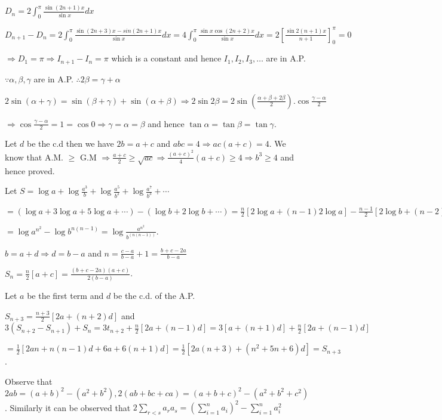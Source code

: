   $\displaystyle D_n = 2\int_0^{\pi}\frac{\sin(2n + 1)x}{\sin x}dx$

  $\displaystyle D_{n + 1} - D_n = 2\int_{0}^\pi\frac{\sin(2n + 3)x - sin(2n + 1)x}{\sin x}dx =
  4\int_0^\pi\frac{\sin x\cos(2n + 2)x}{\sin x}dx = 2\left[\frac{\sin2(n + 1)x}{n + 1}\right]_0^\pi = 0$

  $\Rightarrow D_1 = \pi \Rightarrow I_{n + 1} - I_n = \pi$ which is a constant and hence $I_1, I_2, I_3,
  \ldots$ are in A.P.
\item $\because \alpha, \beta, \gamma$ are in A.P. $\therefore 2\beta = \gamma + \alpha$

  $2\sin(\alpha + \gamma) = \sin(\beta + \gamma) + \sin(\alpha + \beta) \Rightarrow 2\sin2\beta =
  2\sin\left(\frac{\alpha + \beta + 2\beta}{2}\right).\cos\frac{\gamma - \alpha}{2}$

  $\Rightarrow \cos\frac{\gamma - \alpha}{2} = 1 = \cos 0 \Rightarrow \gamma = \alpha = \beta$
  and hence $\tan\alpha = \tan\beta = \tan\gamma$.
\item Let $d$ be the c.d then we have $2b = a + c$ and $abc = 4 \Rightarrow ac(a + c) = 4$. We know that A.M. $\geq$ G.M
  $\Rightarrow \frac{a + c}{2}\geq \sqrt{ac} \Rightarrow \frac{(a + c)^2}{4}(a + c) \geq 4 \Rightarrow b^3
  \geq 4$ and hence proved.
\item Let $S = \log a + \log\frac{a^3}{b} + \log \frac{a^5}{b^2} + \log \frac{a^7}{b^3} + \cdots$

  $= (\log a + 3\log a + 5\log a + \cdots) - (\log b + 2\log b + \cdots) = \frac{n}{2}[2\log a + (n - 1)2\log
  a] - \frac{n - 1}{2}[2\log b + (n - 2)\log b] = \frac{n}{2}[2n\log a] - \frac{n - 1}{2}[2n\log b]$

  $= \log a^{n^2} - \log b^{n(n - 1)} = \log\frac{a^{n^2}}{b^{(n(n - 1))}}$.
\item $b = a + d \Rightarrow d = b - a$ and $n = \frac{c - a}{b - a} + 1 = \frac{b + c - 2a}{b - a}$

  $S_n = \frac{n}{2}[a + c] = \frac{(b + c - 2a)(a + c)}{2(b - a)}$.
\item Let $a$ be the first term and $d$ be the c.d. of the A.P.

  $S_{n + 3} = \frac{n + 3}{2}[2a + (n + 2)d]$ and $3(S_{n + 2} - S_{n + 1}) + S_n = 3t_{n + 2} +
  \frac{n}{2}[2a + (n - 1)d] = 3[a + (n + 1)d] + \frac{n}{2}[2a + (n - 1)d]$

  $= \frac{1}{2}[2an + n(n - 1)d + 6a + 6(n + 1)d] = \frac{1}{2}[2a(n + 3) + (n^2 + 5n + 6)d] = S_{n + 3}$.
\item Observe that $2ab = (a + b)^2 - (a^2 + b^2), 2(ab + bc + ca) = (a + b + c)^2 - (a^2 + b^2 +
  c^2)$. Similarly it can be observed that $\displaystyle2\sum_{r < s}a_ra_s = \left(\sum_{i = 1}^na_i\right)^2 -
  \sum_{i = 1}^n a_i^2$

